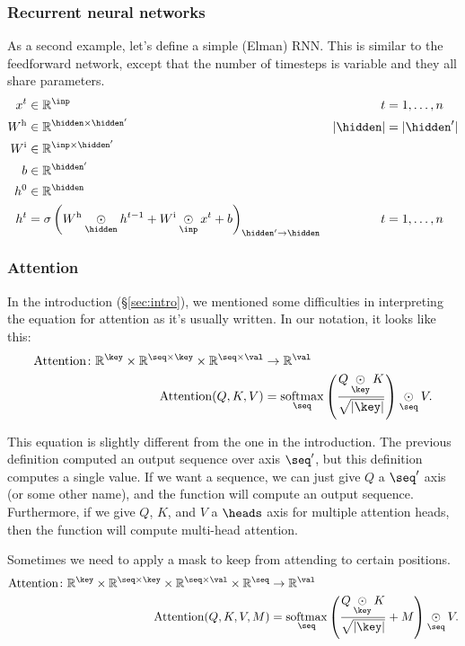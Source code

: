 \documentclass{article}
\begin{document}
\subsubsection{Recurrent neural networks}
\label{sec:rnn}

As a second example, let's define a simple (Elman) RNN. This is similar to the feedforward network, except that the number of timesteps is variable and they all share parameters.
\begin{align*}
x^{t} &\in \mathbb{R}^{\inp} & t &= 1, \ldots, n \\
W^{\text{h}} &\in \mathbb{R}^{\hidden \times \hidden'} & |\hidden| &= |\hidden'| \\
W^{\text{i}} &\in \mathbb{R}^{\inp \times \hidden'} \\
b &\in \mathbb{R}^{\hidden'} \\
h^{0} &\in \mathbb{R}^{\hidden} \\
h^{t} &= \sigma\left( W^{\text{h}} \ndot{\hidden} h^{t-1} + W^{\text{i}} \ndot{\inp} x^{t} + b \right)_{\hidden'\rightarrow\hidden} & t &= 1, \ldots, n
\end{align*}

\subsubsection{Attention}
\label{sec:attention}

In the introduction (\S\ref{sec:intro}), we mentioned some difficulties in interpreting the equation for attention as it's usually written. In our notation, it looks like this:
\begin{align*}
  \text{Attention} \colon \mathbb{R}^{\key} \times \mathbb{R}^{\seq \times\key} \times \mathbb{R}^{\seq \times\val} &\rightarrow \mathbb{R}^{\val} \\
  \text{Attention}(Q,K,V) &= \nfun{\seq}{softmax} \left( \frac{Q \ndot{\key} K}{\sqrt{|\key|}} \right) \ndot{\seq} V.
\end{align*}

This equation is slightly different from the one in the introduction. The previous definition computed an output sequence over axis $\seq'$, but this definition computes a single value. If we want a sequence, we can just give $Q$ a $\seq'$ axis (or some other name), and the function will compute an output sequence. Furthermore, if we give $Q$, $K$, and $V$ a $\heads$ axis for multiple attention heads, then the function will compute multi-head attention.

Sometimes we need to apply a mask to keep from attending to certain positions.
\begin{align*}
  \text{Attention} \colon \mathbb{R}^{\key} \times \mathbb{R}^{\seq \times\key} \times \mathbb{R}^{\seq \times\val} \times \mathbb{R}^{\seq} &\rightarrow \mathbb{R}^{\val} \\
\text{Attention}(Q, K, V, M) &= \nfun{\seq}{softmax} \left( \frac{Q \ndot{\key} K}{\sqrt{|\key|}} + M \right) \ndot{\seq} V.
\end{align*}
\end{document}
